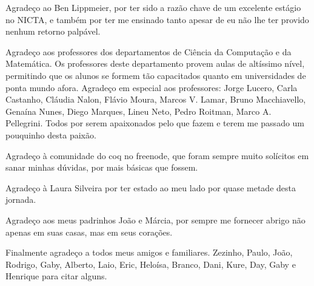 \documentclass[bacharelado]{unb-cic}
\theoremstyle{definition}
\theoremstyle{definition}
\begin{document}
\begin{agradecimentos}
      Agradeço ao Ben Lippmeier, por ter sido a razão chave de um excelente estágio
      no NICTA, e também por ter me ensinado tanto apesar de eu não lhe ter provido nenhum retorno palpável. 

      Agradeço aos professores dos departamentos de Ciência da Computação e da Matemática.
      Os professores deste departamento provem aulas de altíssimo nível,
      permitindo que os alunos se formem tão capacitados quanto em universidades
      de ponta mundo afora.
      Agradeço em especial aos professores: Jorge Lucero, Carla Castanho, Cláudia Nalon, 
      Flávio Moura, Marcos V. Lamar, Bruno Macchiavello, Genaína Nunes, 
      Diego Marques, Lineu Neto, 
      Pedro Roitman, Marco A. Pellegrini. Todos por serem apaixonados pelo que fazem e terem
      me passado um pouquinho desta paixão.

      Agradeço à comunidade do coq no freenode, que foram sempre muito solícitos em
      sanar minhas dúvidas, por mais básicas que fossem.

      Agradeço à Laura Silveira por ter estado ao meu lado por quase metade desta jornada.

      Agradeço aos meus padrinhos João e Márcia, por sempre me fornecer abrigo não apenas em suas casas, mas em seus corações.

      Finalmente agradeço a todos meus amigos e familiares. Zezinho, Paulo, 
      João, Rodrigo, Gaby, Alberto, Laio, Eric, Heloísa, Branco, Dani, Kure, Day, 
      Gaby e Henrique para citar alguns.
  \end{agradecimentos}


  
  \tableofcontents
  \printglossary
  \listoffigures
  \listoftables

  \textual    
  
  
  
  
  
  


  \postextual
  
  
\end{document}
